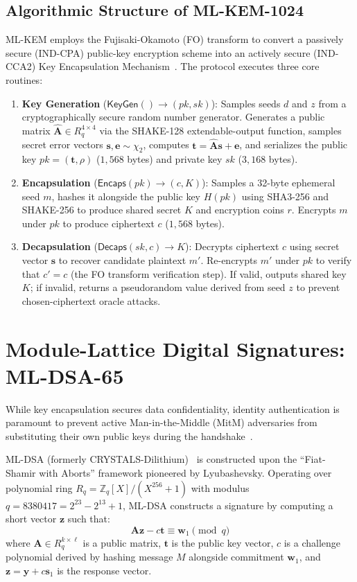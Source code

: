\subsection{Algorithmic Structure of ML-KEM-1024}
ML-KEM employs the Fujisaki-Okamoto (FO) transform to convert a passively secure (IND-CPA) public-key encryption scheme into an actively secure (IND-CCA2) Key Encapsulation Mechanism~\cite{bos2018crystals,nist_fips_203}. The protocol executes three core routines:
\begin{enumerate}
    \item \textbf{Key Generation} ($\mathsf{KeyGen}() \to (pk, sk)$): Samples seeds $d$ and $z$ from a cryptographically secure random number generator. Generates a public matrix $\hat{\mathbf{A}} \in R_q^{4 \times 4}$ via the SHAKE-128 extendable-output function, samples secret error vectors $\mathbf{s}, \mathbf{e} \sim \chi_2$, computes $\mathbf{t} = \hat{\mathbf{A}}\mathbf{s} + \mathbf{e}$, and serializes the public key $pk = (\mathbf{t}, \rho)$ ($1,568$ bytes) and private key $sk$ ($3,168$ bytes).
    \item \textbf{Encapsulation} ($\mathsf{Encaps}(pk) \to (c, K)$): Samples a 32-byte ephemeral seed $m$, hashes it alongside the public key $H(pk)$ using SHA3-256 and SHAKE-256 to produce shared secret $K$ and encryption coins $r$. Encrypts $m$ under $pk$ to produce ciphertext $c$ ($1,568$ bytes).
    \item \textbf{Decapsulation} ($\mathsf{Decaps}(sk, c) \to K$): Decrypts ciphertext $c$ using secret vector $\mathbf{s}$ to recover candidate plaintext $m'$. Re-encrypts $m'$ under $pk$ to verify that $c' = c$ (the FO transform verification step). If valid, outputs shared key $K$; if invalid, returns a pseudorandom value derived from seed $z$ to prevent chosen-ciphertext oracle attacks.
\end{enumerate}

\section{Module-Lattice Digital Signatures: ML-DSA-65}
\label{sec:mldsa_foundations}

While key encapsulation secures data confidentiality, identity authentication is paramount to prevent active Man-in-the-Middle (MitM) adversaries from substituting their own public keys during the handshake~\cite{paquin2020benchmarking}.

ML-DSA (formerly CRYSTALS-Dilithium)~\cite{ducas2018crystals,nist_fips_204} is constructed upon the ``Fiat-Shamir with Aborts'' framework pioneered by Lyubashevsky. Operating over polynomial ring $R_q = \mathbb{Z}_q[X] / (X^{256} + 1)$ with modulus $q = 8380417 = 2^{23} - 2^{13} + 1$, ML-DSA constructs a signature by computing a short vector $\mathbf{z}$ such that:
\begin{equation}
\mathbf{A}\mathbf{z} - c\mathbf{t} \equiv \mathbf{w}_1 \pmod q
\end{equation}
where $\mathbf{A} \in R_q^{k \times \ell}$ is a public matrix, $\mathbf{t}$ is the public key vector, $c$ is a challenge polynomial derived by hashing message $M$ alongside commitment $\mathbf{w}_1$, and $\mathbf{z} = \mathbf{y} + c\mathbf{s}_1$ is the response vector.

